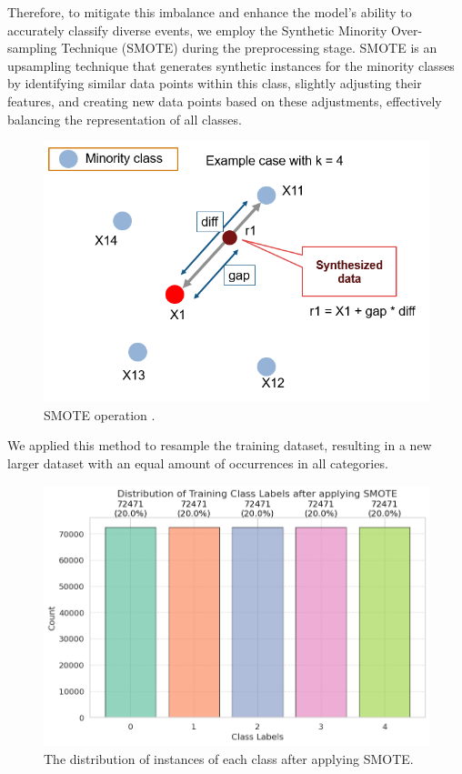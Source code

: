 \documentclass[]{acmsiggraph}
\begin{document}
Therefore, to mitigate this imbalance and enhance the model's ability to accurately classify diverse events, we employ the Synthetic Minority Over-sampling Technique (SMOTE) during the preprocessing stage. SMOTE is an upsampling technique that generates synthetic instances for the minority classes by identifying similar data points within this class, slightly adjusting their features, and creating new data points based on these adjustments, effectively balancing the representation of all classes.

\begin{figure}[h]\centering
 \includegraphics[width=0.75\linewidth]{images/smote.png}
 \caption{\label{fig:reference}SMOTE operation .}
\end{figure}

We applied this method to resample the training dataset, resulting in a new larger dataset with an equal amount of occurrences in all categories.

\begin{figure}[h]\centering
 \includegraphics[width=0.75\linewidth]{images/dis_class_smote.png}
 \caption{\label{fig:reference}The distribution of instances of each class after applying SMOTE.}
\end{figure}
\end{document}

